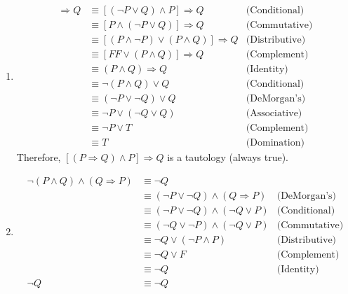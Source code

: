 \documentclass{article}
\theoremstyle{definition}
\begin{document}
\begin{enumerate}[label = \alph*)]
    \item 
    \begin{align*}
        [(P \Rightarrow Q) \wedge P] \Rightarrow Q &\equiv [(\neg P \vee Q) \wedge P] \Rightarrow Q   &\text{(Conditional)} \\
         &\equiv [P \wedge (\neg P \vee Q)] \Rightarrow Q  &\text{(Commutative)}    \\
         &\equiv [(P \wedge \neg P) \vee (P \wedge Q)] \Rightarrow Q &\text{(Distributive)} \\
         &\equiv [FF \vee (P \wedge Q)] \Rightarrow Q &\text{(Complement)} \\
         &\equiv (P \wedge Q) \Rightarrow Q &\text{(Identity)} \\
         &\equiv \neg (P \wedge Q) \vee Q &\text{(Conditional)} \\
         &\equiv (\neg P \vee \neg Q) \vee Q &\text{(DeMorgan's)} \\
         &\equiv \neg P \vee (\neg Q \vee Q) &\text{(Associative)} \\
         &\equiv \neg P \vee T &\text{(Complement)} \\
         &\equiv T &\text{(Domination)}
    \end{align*}
    Therefore, $[(P \Rightarrow Q) \wedge P] \Rightarrow Q$ is a tautology (always true).
   
    \item
    \begin{align*}
        \neg (P \wedge Q) \wedge (Q \Rightarrow P) &\equiv \neg Q \\
        &\equiv (\neg P \vee \neg Q) \wedge (Q \Rightarrow P) &\text{(DeMorgan's)} \\
        &\equiv (\neg P \vee \neg Q) \wedge (\neg Q \vee P) &\text{(Conditional)} \\
        &\equiv (\neg Q \vee \neg P) \wedge (\neg Q \vee P) &\text{(Commutative)} \\
        &\equiv \neg Q \vee (\neg P \wedge P) &\text{(Distributive)} \\
        &\equiv \neg Q \vee F &\text{(Complement)} \\
        &\equiv \neg Q &\text{(Identity)} \\
        \neg Q &\equiv \neg Q
    \end{align*}
    

\end{enumerate}
\end{document}
